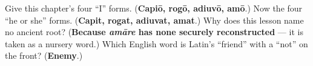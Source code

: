 \begin{tcolorbox}[breakable,colback=teal!4,colframe=teal!35!black,title={Before you move on}]
Give this chapter's four \textquotedblleft{}I\textquotedblright{} forms. (\textbf{Capiō, rogō, adiuvō, amō}.) Now the four \textquotedblleft{}he or she\textquotedblright{} forms. (\textbf{Capit, rogat, adiuvat, amat}.) Why does this lesson name no ancient root? (\textbf{Because \emph{amāre} has none securely reconstructed} — it is taken as a nursery word.) Which English word is Latin's \textquotedblleft{}friend\textquotedblright{} with a \textquotedblleft{}not\textquotedblright{} on the front? (\textbf{Enemy}.)
\end{tcolorbox}
